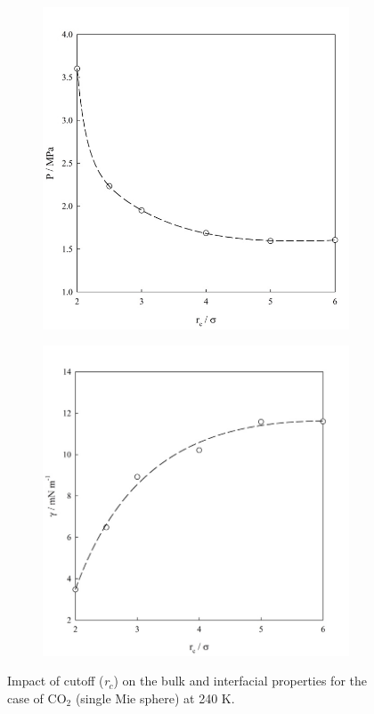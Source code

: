 \documentclass{scrbook}
\begin{document}
\begin{figure}
\begin{subfigure}{0.4\textwidth}
	\end{subfigure}
  \begin{subfigure}{0.4\textwidth} %
    \includegraphics[width=1\textwidth]{gfx/image47.jpeg}
	\end{subfigure}
  \begin{subfigure}{0.4\textwidth} %
    \includegraphics[width=1\textwidth]{gfx/image48.jpeg}
	\end{subfigure}

\caption{Impact of cutoff (\textit{r}$_{c}$) on the bulk and interfacial properties for the case of CO$_{2}$ (single Mie sphere) at 240 K. }
\label{fig:11}
\end{figure}
\end{document}
